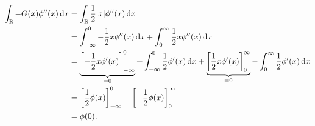\documentclass{exercise}
\begin{document}
\begin{enumerate}
        \begin{align*}
            \int_\R -G\parentheses*{x}\phi''\parentheses*{x}\d x &= \int_\R \frac{1}{2}\absolute*{x}\phi''\parentheses*{x}\d x\\
            &= \int_{-\infty}^0 -\frac{1}{2}x\phi''\parentheses*{x}\d x + \int_0^\infty \frac{1}{2}x\phi''\parentheses*{x}\d x\\
            &= \underbrace{\brackets*{-\frac{1}{2}x\phi'\parentheses*{x}}_{-\infty}^0}_{= 0} + \int_{-\infty}^0 \frac{1}{2}\phi'\parentheses*{x}\d x + \underbrace{\brackets*{\frac{1}{2}x\phi'\parentheses*{x}}_0^\infty}_{= 0} - \int_0^\infty \frac{1}{2}\phi'\parentheses*{x}\d x\\
            &= \brackets*{\frac{1}{2}\phi\parentheses*{x}}_{-\infty}^0 + \brackets*{-\frac{1}{2}\phi\parentheses*{x}}_0^\infty\\
            &= \phi\parentheses*{0}.
        \end{align*}
    \end{enumerate}
\end{document}
